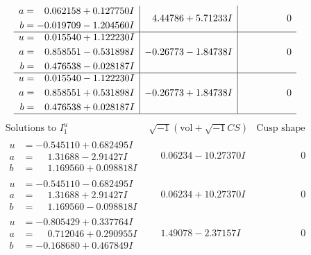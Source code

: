 \documentclass[1p]{elsarticle_modified}
\theoremstyle{definition}
\newcommand{\I}{\sqrt{-1}}
\begin{document}
$$\begin{array}{c|c|c}
\begin{aligned}
a &= \phantom{-}0.062158 + 0.127750 I \\
b &= -0.019709 - 1.204560 I\end{aligned}
 & \phantom{-}4.44786 + 5.71233 I & \phantom{-0.000000 } 0 \\ \hline\begin{aligned}
u &= \phantom{-}0.015540 + 1.122230 I \\
a &= \phantom{-}0.858551 - 0.531898 I \\
b &= \phantom{-}0.476538 - 0.028187 I\end{aligned}
 & -0.26773 - 1.84738 I & \phantom{-0.000000 } 0 \\ \hline\begin{aligned}
u &= \phantom{-}0.015540 - 1.122230 I \\
a &= \phantom{-}0.858551 + 0.531898 I \\
b &= \phantom{-}0.476538 + 0.028187 I\end{aligned}
 & -0.26773 + 1.84738 I & \phantom{-0.000000 } 0\\
 \hline 
 \end{array}$$\newpage$$\begin{array}{c|c|c}  
\text{Solutions to }I^u_{1}& \I (\text{vol} + \sqrt{-1}CS) & \text{Cusp shape}\\
 \hline 
\begin{aligned}
u &= -0.545110 + 0.682495 I \\
a &= \phantom{-}1.31688 - 2.91427 I \\
b &= \phantom{-}1.169560 + 0.098818 I\end{aligned}
 & \phantom{-}0.06234 - 10.27370 I & \phantom{-0.000000 } 0 \\ \hline\begin{aligned}
u &= -0.545110 - 0.682495 I \\
a &= \phantom{-}1.31688 + 2.91427 I \\
b &= \phantom{-}1.169560 - 0.098818 I\end{aligned}
 & \phantom{-}0.06234 + 10.27370 I & \phantom{-0.000000 } 0 \\ \hline\begin{aligned}
u &= -0.805429 + 0.337764 I \\
a &= \phantom{-}0.712046 + 0.290955 I \\
b &= -0.168680 + 0.467849 I\end{aligned}
 & \phantom{-}1.49078 - 2.37157 I & \phantom{-0.000000 } 0 \\ \hline\begin{aligned}

\end{aligned}
\end{array}$$
\end{document}
